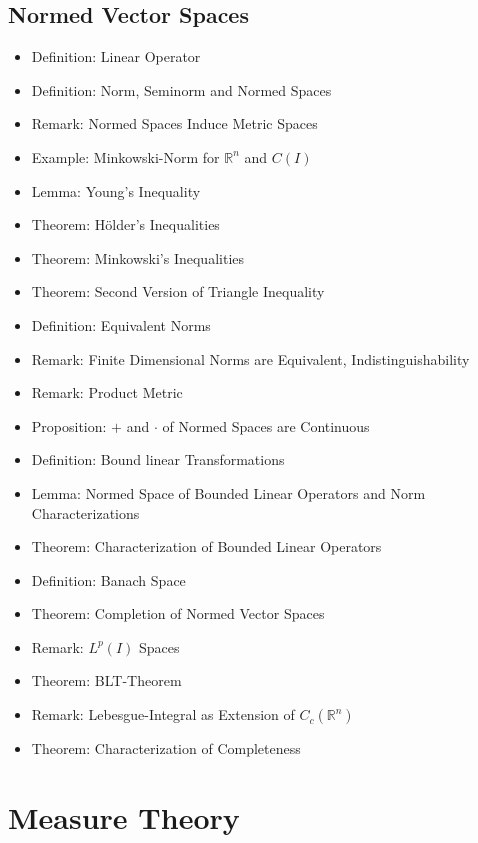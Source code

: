 \documentclass[8pt,twocolumn]{article}
\begin{document}
    \subsection{Normed Vector Spaces} %
    \label{sub:normed_vector_spaces}
      \begin{itemize}
        \item Definition: Linear Operator
        \item Definition: Norm, Seminorm and Normed Spaces
        \item Remark: Normed Spaces Induce Metric Spaces
        \item Example: Minkowski-Norm for $\mathds{R}^n$ and $C(I)$
        \item Lemma: Young's Inequality
        \item Theorem: Hölder's Inequalities
        \item Theorem: Minkowski's Inequalities
        \item Theorem: Second Version of Triangle Inequality
        \item Definition: Equivalent Norms
        \item Remark: Finite Dimensional Norms are Equivalent, Indistinguishability
        \item Remark: Product Metric
        \item Proposition: $+$ and $\cdot$ of Normed Spaces are Continuous
        \item Definition: Bound linear Transformations
        \item Lemma: Normed Space of Bounded Linear Operators and Norm Characterizations
        \item Theorem: Characterization of Bounded Linear Operators
        \item Definition: Banach Space
        \item Theorem: Completion of Normed Vector Spaces
        \item Remark: $L^p(I)$ Spaces
        \item Theorem: BLT-Theorem
        \item Remark: Lebesgue-Integral as Extension of $C_c(\mathds{R}^n)$
        \item Theorem: Characterization of Completeness
      \end{itemize}

  \newpage

  \section{Measure Theory} %
  \label{sec:measure_and_integration_theory}
\end{document}
